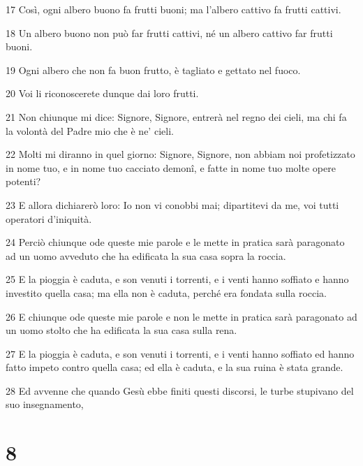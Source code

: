 \par 17 Così, ogni albero buono fa frutti buoni; ma l'albero cattivo fa frutti cattivi.
\par 18 Un albero buono non può far frutti cattivi, né un albero cattivo far frutti buoni.
\par 19 Ogni albero che non fa buon frutto, è tagliato e gettato nel fuoco.
\par 20 Voi li riconoscerete dunque dai loro frutti.
\par 21 Non chiunque mi dice: Signore, Signore, entrerà nel regno dei cieli, ma chi fa la volontà del Padre mio che è ne' cieli.
\par 22 Molti mi diranno in quel giorno: Signore, Signore, non abbiam noi profetizzato in nome tuo, e in nome tuo cacciato demonî, e fatte in nome tuo molte opere potenti?
\par 23 E allora dichiarerò loro: Io non vi conobbi mai; dipartitevi da me, voi tutti operatori d'iniquità.
\par 24 Perciò chiunque ode queste mie parole e le mette in pratica sarà paragonato ad un uomo avveduto che ha edificata la sua casa sopra la roccia.
\par 25 E la pioggia è caduta, e son venuti i torrenti, e i venti hanno soffiato e hanno investito quella casa; ma ella non è caduta, perché era fondata sulla roccia.
\par 26 E chiunque ode queste mie parole e non le mette in pratica sarà paragonato ad un uomo stolto che ha edificata la sua casa sulla rena.
\par 27 E la pioggia è caduta, e son venuti i torrenti, e i venti hanno soffiato ed hanno fatto impeto contro quella casa; ed ella è caduta, e la sua ruina è stata grande.
\par 28 Ed avvenne che quando Gesù ebbe finiti questi discorsi, le turbe stupivano del suo insegnamento,

\chapter{8}

